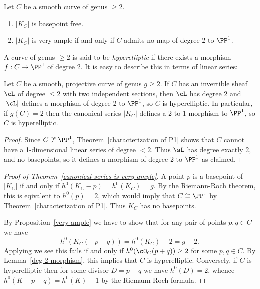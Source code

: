  \begin{theorem}\label{canonical series is very ample} Let $C$ be a smooth curve of genus $\geq 2$.
\begin{enumerate}
 \item $|K_C|$ is basepoint free.
 \item $|K_C|$ is very ample if and only if $C$ admits no map of degree 2 to $\PP^1$.
\end{enumerate}
\end{theorem}

A curve of genus $\geq 2$
is said to be \emph{hyperelliptic} if there exists a morphism $f: C \to \PP^1$ of degree 2. 
It is easy to describe this in terms of linear series:

\begin{lemma}\label{deg 2 morphism}
Let $C$ be a smooth, projective curve of genus $g\geq 2$. If $C$ has an invertible sheaf $\cL$ of degree $\leq 2$ with two independent sections, then $\cL$ has degree 2 and
$|\cL|$ defines a morphism of degree 2 to $\PP^{1}$, so $C$ is hyperelliptic. In particular, if $g(C) = 2$ then the canonical series $|K_{C}|$ defines a 2 to 1 morphism to $\PP^{1}$, so $C$ is hyperelliptic.
\end{lemma}

\begin{proof}
Since $C \not\cong \PP^1$,  Theorem~\ref{characterization of P1} shows that $C$ cannot have a 1-dimensional linear series
of degree $< 2$. Thus $\sL$ has degree exactly 2, and no basepoints, so it defines a morphism of degree 2 to $\PP^1$ as claimed.
\end{proof}

\begin{proof}[Proof of Theorem~\ref{canonical series is very ample}]
A point $p$ is a basepoint of $|K_C|$ if and only if $h^0(K_C-p) = h^0(K_C) = g$. By the Riemann-Roch theorem,
this is eqivalent to $h^0(p) =2$, which would imply that $C\cong \PP^1$ by Theorem~\ref{characterization of P1}. Thus $K_C$
has no basepoints.

By Proposition~\ref{very ample} we have to show that for any pair of points $p, q \in C$ we have
$$
h^0(K_C(-p-q)) = h^0(K_C)-2 = g-2.
$$
Applying \trr we see this fails if and only if $h^0(\cO_C(p+q)) \geq 2$ for some $p,q \in C$. By Lemma~\ref{deg 2 morphism}, this implies that $C$ is hyperelliptic. Conversely, if $C$ is hyperelliptic then for some divisor $D = p+q$ we have $h^0(D) = 2$, whence $h^0(K-p-q) = h^0(K) -1$ by
the Riemann-Roch formula.
\end{proof}

